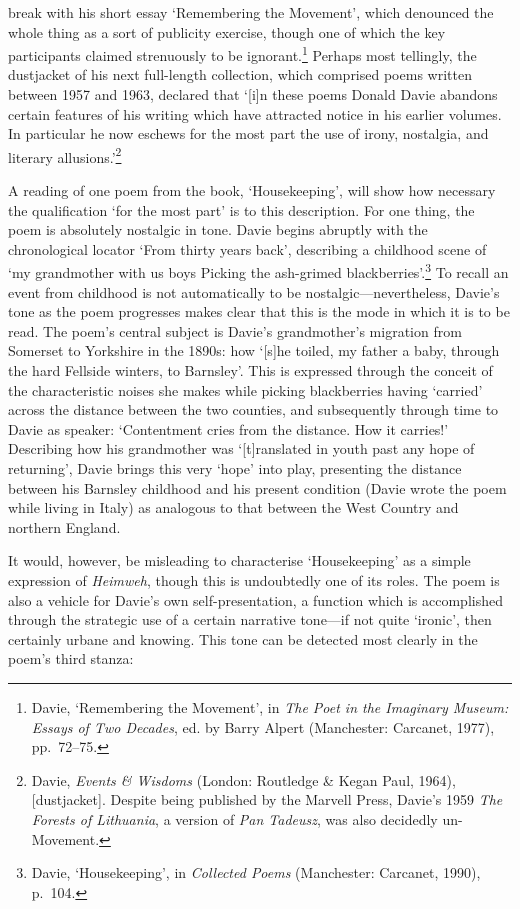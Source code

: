 \documentclass[]{article}
\begin{document}
break with his short essay `Remembering the Movement', which denounced
the whole thing as a sort of publicity exercise, though one of which the
key participants claimed strenuously to be ignorant.\footnote{Davie,
  `Remembering the Movement', in \emph{The Poet in the Imaginary Museum:
  Essays of Two Decades}, ed. by Barry Alpert (Manchester: Carcanet,
  1977), pp.~72--75.} Perhaps most tellingly, the dustjacket of his next
full-length collection, which comprised poems written between 1957 and
1963, declared that `{[}i{]}n these poems Donald Davie abandons certain
features of his writing which have attracted notice in his earlier
volumes. In particular he now eschews for the most part the use of
irony, nostalgia, and literary allusions.'\footnote{Davie, \emph{Events
  \& Wisdoms} (London: Routledge \& Kegan Paul, 1964), {[}dustjacket{]}.
  Despite being published by the Marvell Press, Davie's 1959 \emph{The
  Forests of Lithuania}, a version of \emph{Pan Tadeusz}, was also
  decidedly un-Movement.}

A reading of one poem from the book, `Housekeeping', will show how
necessary the qualification `for the most part' is to this description.
For one thing, the poem is absolutely nostalgic in tone. Davie begins
abruptly with the chronological locator `From thirty years back',
describing a childhood scene of `my grandmother with us boys \textbar{}
Picking the ash-grimed blackberries'.\footnote{Davie, `Housekeeping', in
  \emph{Collected Poems} (Manchester: Carcanet, 1990), p.~104.} To
recall an event from childhood is not automatically to be
nostalgic---nevertheless, Davie's tone as the poem progresses makes
clear that this is the mode in which it is to be read. The poem's
central subject is Davie's grandmother's migration from Somerset to
Yorkshire in the 1890s: how `{[}s{]}he toiled, my father a baby, through
the hard \textbar{} Fellside winters, to Barnsley'. This is expressed
through the conceit of the characteristic noises she makes while picking
blackberries having `carried' across the distance between the two
counties, and subsequently through time to Davie as speaker:
`Contentment cries from the distance. How it carries!' Describing how
his grandmother was `{[}t{]}ranslated in youth past any hope of
returning', Davie brings this very `hope' into play, presenting the
distance between his Barnsley childhood and his present condition (Davie
wrote the poem while living in Italy) as analogous to that between the
West Country and northern England.

It would, however, be misleading to characterise `Housekeeping' as a
simple expression of \emph{Heimweh}, though this is undoubtedly one of
its roles. The poem is also a vehicle for Davie's own self-presentation,
a function which is accomplished through the strategic use of a certain
narrative tone---if not quite `ironic', then certainly urbane and
knowing. This tone can be detected most clearly in the poem's third
stanza:
\end{document}
